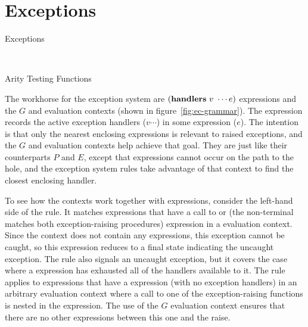 \section{Exceptions}

\beginfig
\begin{center}

\end{center}
\caption{Exceptions}\label{fig:exceptions}
\endfig

\beginfig
\begin{center}
\begin{minipage}{0.45\textwidth}

\end{minipage}
~
\begin{minipage}{0.45\textwidth}

\end{minipage}
\end{center}
\caption{Arity Testing Functions}\label{fig:arity}
\endfig

The workhorse for the exception system are $(\textnormal{\textbf{handlers}}~v~\cdots{}
e)$ expressions and the $G$ and  evaluation contexts (shown in
figure~\ref{fig:ec-grammar}). The  expression records the
active exception handlers ($v \cdots$) in some expression ($e$). The
intention is that only the nearest enclosing  expressions
is relevant to raised exceptions, and the $G$ and  evaluation
contexts help achieve that goal. They are just like their counterparts
$P$ and $E$, except that  expressions cannot occur on the
path to the hole, and the exception system rules take advantage of
that context to find the closest enclosing handler.

To see how the contexts work together with 
expressions, consider the left-hand side of the 
rule. It matches expressions that have a call to  or
 (the non-terminal  matches
both exception-raising procedures) expression in a 
evaluation context. Since the  context does not contain any
 expressions, this exception cannot be caught, so
this expression reduces to a final state indicating the uncaught
exception. The rule  also signals an uncaught
exception, but it covers the case where a  expression
has exhausted all of the handlers available to it. The rule applies to
expressions that have a  expression (with no
exception handlers) in an arbitrary evaluation context where a call to
one of the exception-raising functions is nested in the
 expression. The use of the $G$ evaluation
context ensures that there are no other  expressions
between this one and the raise.

